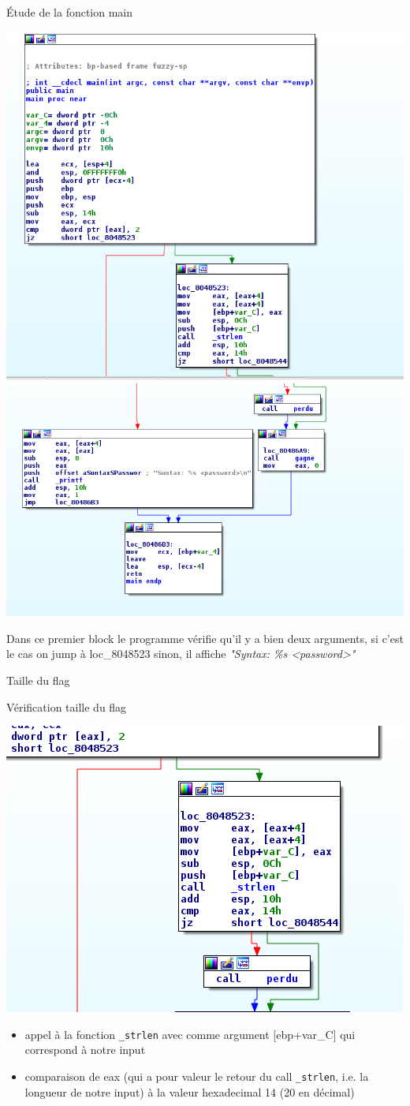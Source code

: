 \documentclass[10pt,sans,usenames,dvipsnames,french,compress]{beamer}
\begin{document}
\begin{frame}[fragile]{Étude de la fonction main}
	\vspace{-2mm}
	\begin{center}
		\includegraphics[width=0.5\linewidth]{114/main.png}%
		\includegraphics[width=0.5\linewidth]{114/syntax.png}
	\end{center}

	\begin{block}{}
		Dans ce premier block le programme vérifie qu'il y a bien deux arguments, si c'est le cas on jump à loc\_8048523 sinon, il affiche \textit{"Syntax: \%s <password>"}
	\end{block}
\end{frame}

\begin{frame}[fragile]{Taille du flag}
	\begin{block}{Vérification taille du flag}
		\begin{center}
			\includegraphics[width=0.5\linewidth]{114/lenght.png}
		\end{center}
	\end{block}

	\begin{exampleblock}{}
		\begin{itemize}
			\item appel à la fonction \texttt{\_strlen} avec comme argument [ebp+var\_C] qui correspond à notre input
			\item comparaison de eax (qui a pour valeur le retour du call \texttt{\_strlen}, i.e. la longueur de notre input) à la valeur hexadecimal 14 (20 en décimal)
		\end{itemize}
	\end{exampleblock}
\end{frame}
\end{document}
